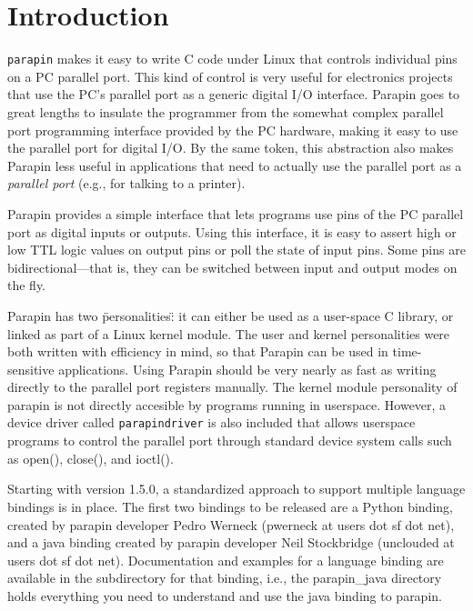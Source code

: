 \documentclass{article}
\begin{document}

\section{Introduction}


{\tt parapin} makes it easy to write C code under Linux that controls
individual pins on a PC parallel port.  This kind of control is very
useful for electronics projects that use the PC's parallel port as a
generic digital I/O interface.  Parapin goes to great lengths to
insulate the programmer from the somewhat complex parallel port
programming interface provided by the PC hardware, making it easy to
use the parallel port for digital I/O.  By the same token, this
abstraction also makes Parapin less useful in applications that need
to actually use the parallel port as a {\em parallel port} (e.g., for
talking to a printer).

Parapin provides a simple interface that lets programs use pins of the
PC parallel port as digital inputs or outputs.  Using this interface,
it is easy to assert high or low TTL logic values on output pins or
poll the state of input pins.  Some pins are bidirectional---that is,
they can be switched between input and output modes on the fly.

Parapin has two \"personalities\": it can either be used as a
user-space C library, or linked as part of a Linux kernel module.  The
user and kernel personalities were both written with efficiency in
mind, so that Parapin can be used in time-sensitive applications.
Using Parapin should be very nearly as fast as writing directly to the
parallel port registers manually.  The kernel module personality 
of parapin is not directly accesible by programs running in userspace.
However, 
a device driver called {\tt parapindriver} is also included that allows
userspace programs to control the parallel port through standard device
system calls such as open(), close(), and ioctl().

Starting with version 1.5.0, a standardized approach to support
multiple language bindings is in place.  The first two bindings to
be released are a Python binding, created by parapin developer
Pedro Werneck (pwerneck at users dot sf dot net), and a java binding
created by parapin developer Neil Stockbridge
(unclouded at users dot sf dot net).
Documentation and examples for a language binding are available in
the subdirectory for that binding, i.e., the parapin\_java directory
holds everything you need to understand and use the java binding to
parapin.
\end{document}
